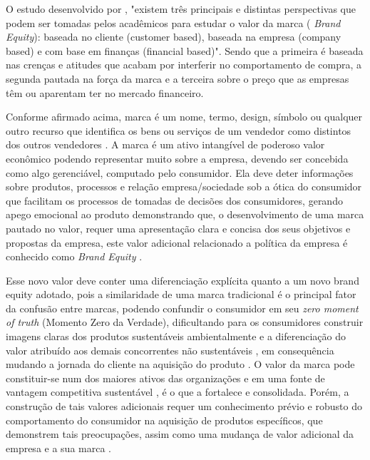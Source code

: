 O estudo desenvolvido por , "existem três principais e distintas perspectivas que podem ser tomadas pelos acadêmicos para estudar o valor da marca ( \textit{Brand Equity}): baseada no cliente (customer based), baseada na empresa (company based) e com base em finanças (financial based)". Sendo que a primeira é baseada nas crenças e atitudes que acabam por interferir no comportamento de compra, a segunda pautada na força da marca e a terceira sobre o preço que as empresas têm ou aparentam ter no mercado financeiro.

Conforme afirmado acima, marca é um nome, termo, design, símbolo ou qualquer outro recurso que identifica os bens ou serviços de um vendedor como distintos dos outros vendedores \cite{Keller2006BrandsPriorities}. A marca é um ativo intangível de poderoso valor econômico podendo representar muito sobre a empresa, devendo ser concebida como algo gerenciável, computado pelo consumidor. Ela deve deter informações sobre produtos, processos e relação empresa/sociedade sob a ótica do consumidor que facilitam os processos de tomadas de decisões dos consumidores, gerando apego emocional ao produto \cite{Jacoby1977InformationSituations,Kocyigit2011TheEquity} demonstrando que, o desenvolvimento de uma marca pautado no valor, requer uma apresentação clara e concisa dos seus objetivos e propostas da empresa, este valor adicional \cite{Kayo2006AtivosValor} relacionado a política da empresa é conhecido como \textit{Brand Equity} \cite{Kotler2019MarketingManagement}.

Esse novo valor deve conter uma diferenciação explícita quanto a um novo brand equity adotado, pois a similaridade de uma marca tradicional é o principal fator da confusão entre marcas, podendo confundir o consumidor em seu \textit{zero moment of truth} (Momento Zero da Verdade), dificultando para os consumidores construir imagens claras dos produtos sustentáveis ambientalmente e a diferenciação do valor atribuído aos demais concorrentes não sustentáveis \cite{Kocyigit2011TheEquity}, em consequência mudando a jornada do cliente na aquisição do produto \cite{Lemon2016UnderstandingJourney:}. O valor da marca pode constituir-se num dos maiores ativos das organizações e em uma fonte de vantagem competitiva sustentável \cite{Aaker1997DimensionsPersonality}, é o que a fortalece e consolidada. Porém, a construção de tais valores adicionais requer um conhecimento prévio e robusto do comportamento do consumidor na aquisição de produtos específicos, que demonstrem tais preocupações, assim como uma mudança de valor adicional da empresa e a sua marca \cite{McDonald2006Sustainability:Strategies}. 

